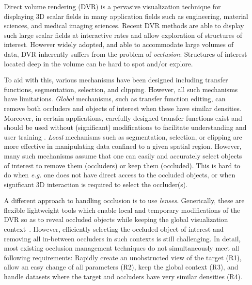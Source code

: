 Direct volume rendering (DVR) is a pervasive visualization technique for displaying 3D scalar fields in many application fields such as engineering, material sciences, and medical imaging sciences. Recent DVR methods are able to display such large scalar fields at interactive rates and allow exploration of structures of interest. However widely adopted, and able to accommodate large volumes of data, DVR inherently suffers from the problem of \emph{occlusion}: Structures of interest located deep in the volume can be hard to spot and/or explore.

To aid with this, various mechanisms have been designed including transfer functions, segmentation, selection, and clipping. However, all such mechanisms have limitations.  \emph{Global} mechanisms, such as transfer function editing, can remove both occluders and objects of interest when these have similar densities. Moreover, in certain applications, carefully designed transfer functions exist and should be used without (significant) modifications to facilitate understanding and user training \cite{4276082}. \emph{Local} mechanisms such as segmentation, selection, or clipping are more effective in manipulating data confined to a given spatial region. However, many such mechanisms assume that one can easily and accurately select objects of interest to remove them (occluders) or keep them (occluded). This is hard to do when \emph{e.g.} one does not have direct access to the occluded objects, or when significant 3D interaction is required to select the occluder(s).

A different approach to handling occlusion is to use \emph{lenses}. Generically, these are flexible lightweight tools which enable local and temporary modifications of the DVR so as to reveal occluded objects while keeping the global visualization context~\cite{595268,CGF:CGF12871,6327262}. However, efficiently selecting the occluded object of interest and removing all in-between occluders in such contexts is still challenging. In detail, most existing occlusion management techniques do not simultaneously meet all following requirements:
Rapidly create an unobstructed view of the target (R1), 
allow an easy change of all parameters (R2), 
keep the global context (R3), 
and handle datasets where the target and occluders have very similar
densities (R4).

